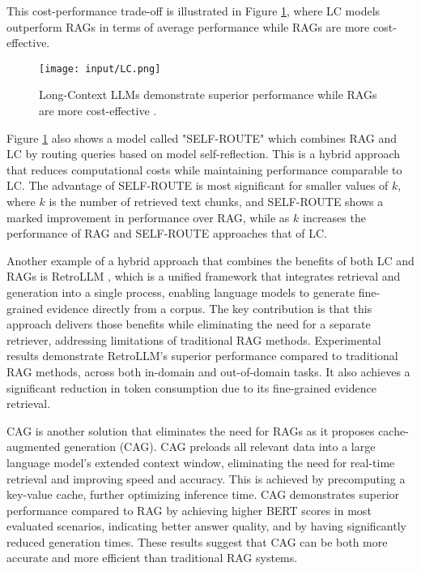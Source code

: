 This cost-performance trade-off is illustrated in Figure \ref{fig:LC}, where LC models outperform RAGs in terms of average performance while RAGs are more cost-effective.

\begin{figure}[H]
\centering
\texttt{[image: input/LC.png]}
\caption{Long-Context LLMs demonstrate superior performance while RAGs are more cost-effective \cite{li2024retrievalaugmentedgenerationlongcontext}.}
\label{fig:LC}
\end{figure}
Figure \ref{fig:LC} also shows a model called "SELF-ROUTE" which combines RAG and LC by routing queries based on model self-reflection. This is a hybrid approach that reduces computational costs while maintaining performance comparable to LC. The advantage of SELF-ROUTE is most significant for smaller values of $k$, where $k$ is the number of retrieved text chunks, and SELF-ROUTE shows a marked improvement in performance over RAG, while as $k$ increases the performance of RAG and SELF-ROUTE approaches that of LC.

Another example of a hybrid approach that combines the benefits of both LC and RAGs is RetroLLM , which is a unified framework that integrates retrieval and generation into a single process, enabling language models to generate fine-grained evidence directly from a corpus. The key contribution is that this approach delivers those benefits while eliminating the need for a separate retriever, addressing limitations of traditional RAG methods. Experimental results demonstrate RetroLLM's superior performance compared to traditional RAG methods, across both in-domain and out-of-domain tasks. It also achieves a significant reduction in token consumption due to its fine-grained evidence retrieval.

CAG  is another solution that eliminates the need for RAGs as it proposes cache-augmented generation (CAG). CAG preloads all relevant data into a large language model's extended context window, eliminating the need for real-time retrieval and improving speed and accuracy. This is achieved by precomputing a key-value cache, further optimizing inference time. CAG demonstrates superior performance compared to RAG by achieving higher BERT scores in most evaluated scenarios, indicating better answer quality, and by having significantly reduced generation times. These results suggest that CAG can be both more accurate and more efficient than traditional RAG systems.

